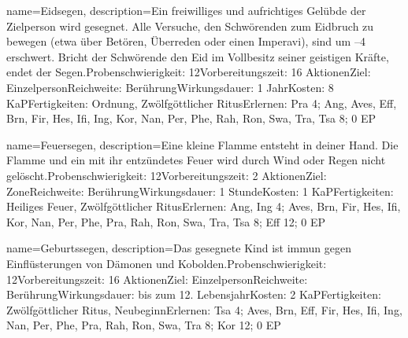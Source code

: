 {
    name={Eidsegen},
    description={Ein freiwilliges und aufrichtiges Gelübde der Zielperson wird gesegnet. Alle Versuche, den Schwörenden zum Eidbruch zu bewegen (etwa über Betören, Überreden oder einen Imperavi), sind um –4 erschwert. Bricht der Schwörende den Eid im Vollbesitz seiner geistigen Kräfte, endet der Segen.\newline Probenschwierigkeit: 12\newline Vorbereitungszeit: 16 Aktionen\newline Ziel: Einzelperson\newline Reichweite: Berührung\newline Wirkungsdauer: 1 Jahr\newline Kosten: 8 KaP\newline Fertigkeiten: Ordnung, Zwölfgöttlicher Ritus\newline Erlernen: Pra 4; Ang, Aves, Eff, Brn, Fir, Hes, Ifi, Ing, Kor, Nan, Per, Phe, Rah, Ron, Swa, Tra, Tsa 8; 0 EP}
}


{
    name={Feuersegen},
    description={Eine kleine Flamme entsteht in deiner Hand. Die Flamme und ein mit ihr entzündetes Feuer wird durch Wind oder Regen nicht gelöscht.\newline Probenschwierigkeit: 12\newline Vorbereitungszeit: 2 Aktionen\newline Ziel: Zone\newline Reichweite: Berührung\newline Wirkungsdauer: 1 Stunde\newline Kosten: 1 KaP\newline Fertigkeiten: Heiliges Feuer, Zwölfgöttlicher Ritus\newline Erlernen: Ang, Ing 4; Aves, Brn, Fir, Hes, Ifi, Kor, Nan, Per, Phe, Pra, Rah, Ron, Swa, Tra, Tsa 8; Eff 12; 0 EP}
}


{
    name={Geburtssegen},
    description={Das gesegnete Kind ist immun gegen Einflüsterungen von Dämonen und Kobolden.\newline Probenschwierigkeit: 12\newline Vorbereitungszeit: 16 Aktionen\newline Ziel: Einzelperson\newline Reichweite: Berührung\newline Wirkungsdauer: bis zum 12. Lebensjahr\newline Kosten: 2 KaP\newline Fertigkeiten: Zwölfgöttlicher Ritus, Neubeginn\newline Erlernen: Tsa 4; Aves, Brn, Eff, Fir, Hes, Ifi, Ing, Nan, Per, Phe, Pra, Rah, Ron, Swa, Tra 8; Kor 12; 0 EP}
}



